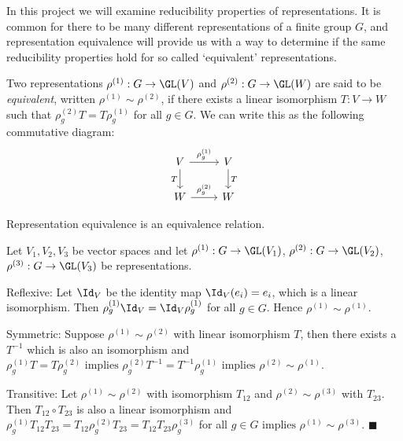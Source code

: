\documentclass[../Project.tex]{subfiles}
\begin{document}
In this project we will examine reducibility properties of representations. It is common for there to be many different representations of a finite group $G$, and representation equivalence will provide us with a way to determine if the same reducibility properties hold for so called `equivalent' representations.
\begin{defi}
	Two representations $\rho^{(1)} : G \to \GL(V)$ and $\rho^{(2)} : G \to \GL(W)$ are said to be \textit{equivalent}, written $\rho^{(1)} \sim \rho^{(2)}$, if there exists a linear isomorphism $T : V \to W$ such that $\rho^{(2)}_gT =T\rho^{(1)}_g$ for all $g \in G$. We can write this as the following commutative diagram:
	$$
	\begin{tikzcd}
		V \arrow{r}{\rho^{(1)}_g} \arrow[swap]{d}{T} & V \arrow{d}{T} \\%
		W \arrow{r}{\rho^{(2)}_g}&W 
	\end{tikzcd}
	$$
\end{defi}

\begin{prop}
	Representation equivalence is an equivalence relation.
\end{prop}

\begin{proo*}
		Let $V_1,V_2,V_3$ be vector spaces and let $\rho^{(1)} : G \to \GL(V_1)$, $\rho^{(2)} : G \to \GL(V_2)$, $\rho^{(3)} : G \to \GL(V_3)$ be representations.
	\begin{mitem}
		\item Reflexive: Let $\Id_V$ be the identity map $\Id_V(e_i) = e_i$, which is a linear isomorphism. Then $\rho^{(1)}_g \Id_V = \Id_V\rho^{(1)}_g$ for all $g \in G$. Hence $\rho^{(1)} \sim \rho^{(1)}$.
		\item Symmetric: Suppose $\rho^{(1)} \sim \rho^{(2)}$ with linear isomorphism $T$, then there exists a $T^{-1}$ which is also an isomorphism and $\rho^{(1)}_g T = T\rho^{(2)}_g \text{ implies } \rho^{(2)}_gT^{-1} = T^{-1}\rho^{(1)}_g \text{ implies } \rho^{(2)} \sim \rho^{(1)}$.
		\item Transitive: Let $\rho^{(1)} \sim \rho^{(2)}$ with isomorphism $T_{12}$ and $\rho^{(2)} \sim \rho^{(3)}$ with $T_{23}$. Then $T_{12} \circ T_{23}$ is also a linear isomorphism and $\rho^{(1)}_gT_{12}T_{23} = T_{12}\rho^{(2)}_g T_{23} = T_{12} T_{23} \rho^{(3)}_g$ for all $g \in G\text{ implies } \rho^{(1)} \sim \rho^{(3)}$. \hfill $\blacksquare$\\
	\end{mitem}
\end{proo*}
\end{document}
